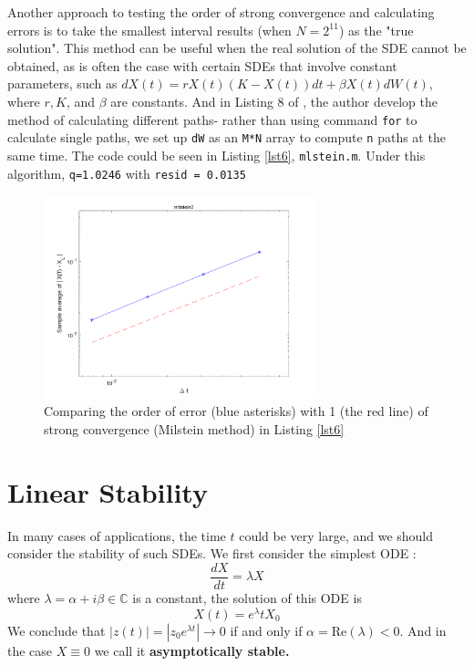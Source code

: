 \documentclass[12pt,a4paper]{article}
\newcommand{\C}{\mathbb{C}}
\theoremstyle{definition}
\begin{document}
Another approach to testing the order of strong convergence and calculating errors is to take the smallest interval results (when $N=2^{11}$) as the "true solution". This method can be useful when the real solution of the SDE cannot be obtained, as is often the case with certain SDEs that involve constant parameters, such as $dX(t) = rX(t)(K-X(t))dt+\beta X(t)dW(t)$, where $r, K$, and $\beta$ are constants. And in Listing 8 of \cite{higham._2001}, the author develop the method of calculating different paths- rather than using command \verb|for| to calculate single paths, we set up \verb|dW| as an \verb|M*N| array to compute \verb|n| paths at the same time. The code could be seen in Listing \ref{lst6}, \verb|mlstein.m|. Under this algorithm, \verb|q=1.0246| with \verb|resid = 0.0135|



\begin{figure}[htbp]
\centering
\includegraphics[width=0.7\textwidth]{fig/fig10.png}
\caption{\label{fig10} Comparing the order of error (blue asterisks) with 1 (the red line) of strong convergence (Milstein method) in Listing \ref{lst6} }
\end{figure}

\section{Linear Stability}
In many cases of applications, the time $t$ could be very large, and we should consider the stability of such SDEs. We first consider the simplest ODE \cite{Kloeden}:$$
\frac{dX}{dt}=\lambda X
$$
where $\lambda=\alpha+i\beta\in \C$ is a constant, the solution of this ODE is\begin{equation}
    X(t)=e^{\lambda} t X_0
\end{equation}
We conclude that $|z(t)|=|z_0e^{\lambda t}|\to 0$ if and only if $\alpha=\text{Re}(\lambda)<0$. And in the case $X\equiv 0$ we call it \textbf{asymptotically stable.}
\end{document}
